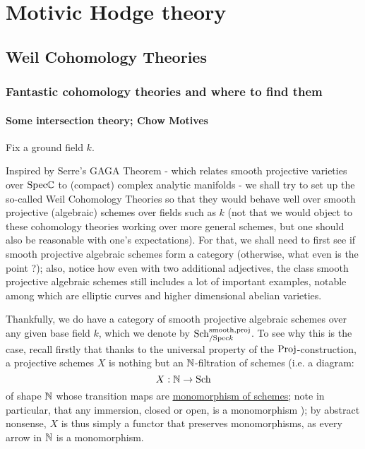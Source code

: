 \chapter{Motivic Hodge theory}
    \begin{abstract}
        
    \end{abstract}
    
    \minitoc
    
    \section{Weil Cohomology Theories}
        \subsection{Fantastic cohomology theories and where to find them}
            \subsubsection{Some intersection theory; Chow Motives}
                \begin{remark} \label{remark: categories_of_smooth_projective_schemes}
                    Fix a ground field $k$. 
                    
                    Inspired by Serre's GAGA Theorem - which relates smooth projective varieties over $\mathrm{Spec} \mathbb{C}$ to (compact) complex analytic manifolds - we shall try to set up the so-called Weil Cohomology Theories so that they would behave well over smooth projective (algebraic) schemes over fields such as $k$ (not that we would object to these cohomology theories working over more general schemes, but one should also be reasonable with one's expectations). For that, we shall need to first see if smooth projective algebraic schemes form a category (otherwise, what even is the point ?); also, notice how even with two additional adjectives, the class smooth projective algebraic schemes still includes a lot of important examples, notable among which are elliptic curves and higher dimensional abelian varieties.
                    
                    Thankfully, we do have a category of smooth projective algebraic schemes over any given base field $k$, which we denote by $\mathrm{Sch}_{/\mathrm{Spec} k}^{\mathrm{smooth}, \mathrm{proj}}$. To see why this is the case, recall firstly that thanks to the universal property of the $\mathrm{Proj}$-construction, a projective schemes $X$ is nothing but an $\mathbb{N}$-filtration of schemes (i.e. a diagram:
                        $$X: \mathbb{N} \to \mathrm{Sch}$$
                    of shape $\mathbb{N}$ whose transition maps are \href{https://stacks.math.columbia.edu/tag/01L1}{\underline{monomorphism of schemes}}; note in particular, that any immersion, closed or open, is a monomorphism \cite[\href{https://stacks.math.columbia.edu/tag/01L7}{Tag 01L7}]{stacks}); by abstract nonsense, $X$ is thus simply a functor that preserves monomorphisms, as every arrow in $\mathbb{N}$ is a monomorphism.  
                \end{remark}
                
